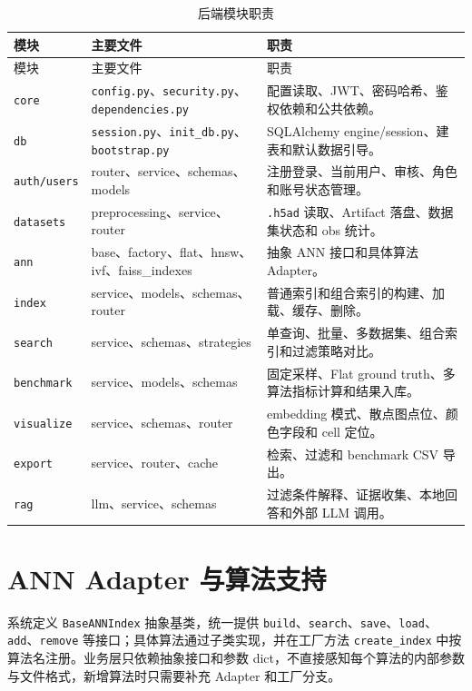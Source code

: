 \documentclass[UTF8,a4paper,12pt]{ctexrep}
\begin{document}
\begin{longtable}{L{0.18\textwidth}L{0.32\textwidth}L{0.40\textwidth}}
  \caption{后端模块职责} \\
  \toprule
  模块 & 主要文件 & 职责 \\
  \midrule
  \endfirsthead
  \toprule
  模块 & 主要文件 & 职责 \\
  \midrule
  \endhead
  \texttt{core} & \texttt{config.py}、\texttt{security.py}、\texttt{dependencies.py} & 配置读取、JWT、密码哈希、鉴权依赖和公共依赖。 \\
  \texttt{db} & \texttt{session.py}、\texttt{init\_db.py}、\texttt{bootstrap.py} & SQLAlchemy engine/session、建表和默认数据引导。 \\
  \texttt{auth/users} & router、service、schemas、models & 注册登录、当前用户、审核、角色和账号状态管理。 \\
  \texttt{datasets} & preprocessing、service、router & \texttt{.h5ad} 读取、Artifact 落盘、数据集状态和 obs 统计。 \\
  \texttt{ann} & base、factory、flat、hnsw、ivf、faiss\_indexes & 抽象 ANN 接口和具体算法 Adapter。 \\
  \texttt{index} & service、models、schemas、router & 普通索引和组合索引的构建、加载、缓存、删除。 \\
  \texttt{search} & service、schemas、strategies & 单查询、批量、多数据集、组合索引和过滤策略对比。 \\
  \texttt{benchmark} & service、models、schemas & 固定采样、Flat ground truth、多算法指标计算和结果入库。 \\
  \texttt{visualize} & service、schemas、router & embedding 模式、散点图点位、颜色字段和 cell 定位。 \\
  \texttt{export} & service、router、cache & 检索、过滤和 benchmark CSV 导出。 \\
  \texttt{rag} & llm、service、schemas & 过滤条件解释、证据收集、本地回答和外部 LLM 调用。 \\
  \bottomrule
\end{longtable}

\section{ANN Adapter 与算法支持}

系统定义 \texttt{BaseANNIndex} 抽象基类，统一提供 \texttt{build}、\texttt{search}、\texttt{save}、\texttt{load}、\texttt{add}、\texttt{remove} 等接口；具体算法通过子类实现，并在工厂方法 \texttt{create\_index} 中按算法名注册。业务层只依赖抽象接口和参数 dict，不直接感知每个算法的内部参数与文件格式，新增算法时只需要补充 Adapter 和工厂分支。
\end{document}
